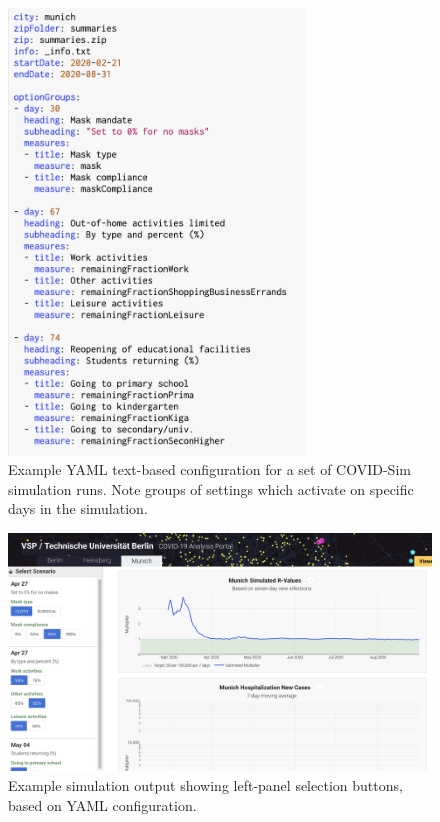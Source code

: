 \begin{figure}
  \centering
	\begin{minipage}{0.9\textwidth}
    \centering
    \includegraphics[width=0.7\textwidth]{chapters/21-covid-sim/images/covid-yaml.png}
  \caption{Example YAML text-based configuration for a set of COVID-Sim simulation runs. Note groups of settings which activate on specific days in the simulation.}
  \label{fig:covid-yaml}
	\end{minipage}
\end{figure}

\begin{figure}
  \centering
	\begin{minipage}{0.9\textwidth}
    \includegraphics[width=\textwidth]{chapters/21-covid-sim/images/covid-buttons.png}
  \caption{Example simulation output showing left-panel selection buttons, based on YAML configuration.}
  \label{fig:covid-buttons}
	\end{minipage}
\end{figure}


